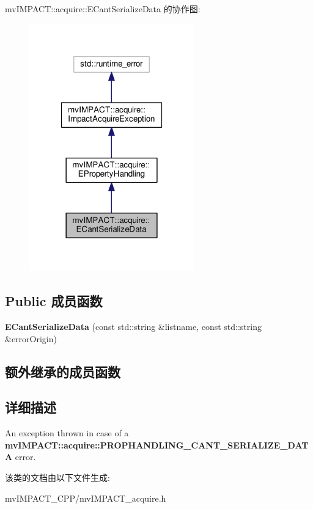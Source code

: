 mv\+I\+M\+P\+A\+C\+T\+:\+:acquire\+:\+:E\+Cant\+Serialize\+Data 的协作图\+:
\nopagebreak
\begin{figure}[H]
\begin{center}
\leavevmode
\includegraphics[width=202pt]{classmv_i_m_p_a_c_t_1_1acquire_1_1_e_cant_serialize_data__coll__graph}
\end{center}
\end{figure}
\subsection*{Public 成员函数}
\begin{DoxyCompactItemize}
\item 
\hypertarget{classmv_i_m_p_a_c_t_1_1acquire_1_1_e_cant_serialize_data_a5f21db7557f6af17c3317431f8c1cb4f}{{\bfseries E\+Cant\+Serialize\+Data} (const std\+::string \&listname, const std\+::string \&error\+Origin)}\label{classmv_i_m_p_a_c_t_1_1acquire_1_1_e_cant_serialize_data_a5f21db7557f6af17c3317431f8c1cb4f}

\end{DoxyCompactItemize}
\subsection*{额外继承的成员函数}


\subsection{详细描述}
An exception thrown in case of a {\bfseries mv\+I\+M\+P\+A\+C\+T\+::acquire\+::\+P\+R\+O\+P\+H\+A\+N\+D\+L\+I\+N\+G\+\_\+\+C\+A\+N\+T\+\_\+\+S\+E\+R\+I\+A\+L\+I\+Z\+E\+\_\+\+D\+A\+T\+A} error. 

该类的文档由以下文件生成\+:\begin{DoxyCompactItemize}
\item 
mv\+I\+M\+P\+A\+C\+T\+\_\+\+C\+P\+P/mv\+I\+M\+P\+A\+C\+T\+\_\+acquire.\+h\end{DoxyCompactItemize}
